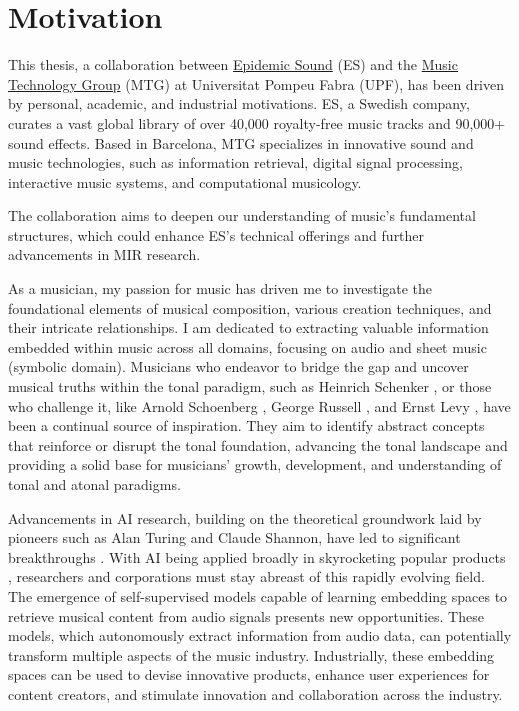 \section{Motivation}

This thesis, a collaboration between \href{https://www.epidemicsound.com/}{Epidemic Sound} (ES) and the \href{https://www.upf.edu/web/mtg}{Music Technology Group} (MTG) at Universitat Pompeu Fabra (UPF), has been driven by personal, academic, and industrial motivations. ES, a Swedish company, curates a vast global library of over 40,000 royalty-free music tracks and 90,000+ sound effects. Based in Barcelona, MTG specializes in innovative sound and music technologies, such as information retrieval, digital signal processing, interactive music systems, and computational musicology.

The collaboration aims to deepen our understanding of music's fundamental structures, which could enhance ES's technical offerings and further advancements in MIR research.

As a musician, my passion for music has driven me to investigate the foundational elements of musical composition, various creation techniques, and their intricate relationships. I am dedicated to extracting valuable information embedded within music across all domains, focusing on audio and sheet music (symbolic domain). Musicians who endeavor to bridge the gap and uncover musical truths within the tonal paradigm, such as Heinrich Schenker \cite{Komar1959SchenkersStructure}, or those who challenge it, like Arnold Schoenberg \cite{Samson1974SchoenbergsMusic}, George Russell \cite{LydianRussell}, and Ernst Levy \cite{LevyAHarmony}, have been a continual source of inspiration. They aim to identify abstract concepts that reinforce or disrupt the tonal foundation, advancing the tonal landscape and providing a solid base for musicians' growth, development, and understanding of tonal and atonal paradigms.

Advancements in AI research, building on the theoretical groundwork laid by pioneers such as Alan Turing and Claude Shannon, have led to significant breakthroughs \cite{Vaswani2017AttentionNeed}. With AI being applied broadly in skyrocketing popular products \cite{OpenAI2023GPT-4Report}, researchers and corporations must stay abreast of this rapidly evolving field. The emergence of self-supervised models capable of learning embedding spaces to retrieve musical content from audio signals presents new opportunities. These models, which autonomously extract information from audio data, can potentially transform multiple aspects of the music industry. Industrially, these embedding spaces can be used to devise innovative products, enhance user experiences for content creators, and stimulate innovation and collaboration across the industry.

